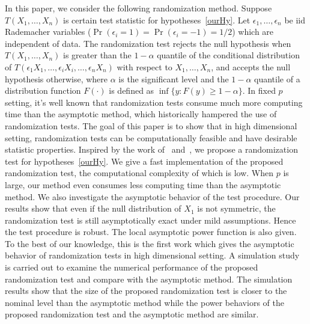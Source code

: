 \documentclass[3p]{elsarticle}
\theoremstyle{plain}
\theoremstyle{definition}
\theoremstyle{remark}
\begin{document}
In this paper, we consider the following randomization method.
Suppose $T(X_1,\ldots,X_n)$ is certain test statistic for hypotheses~\eqref{ourHy}.
Let $\epsilon_1,\ldots,\epsilon_n$ be iid Rademacher variables ($\Pr(\epsilon_i=1)=\Pr(\epsilon_i=-1)=1/2$) which are independent of data.
 The randomization test rejects the null hypothesis when $T(X_1,\ldots, X_n)$ is greater than the $1-\alpha$ quantile of the conditional distribution of $T(\epsilon_1 X_1,\ldots,\epsilon_i X_i,\ldots,\epsilon_n X_n)$ with respect to $X_1,\ldots,X_n$,
 and accepts the null hypothesis otherwise, where $\alpha$ is the significant level and the $1-\alpha$ quantile of a distribution function $F(\cdot)$ is defined as $\inf\{y: F(y)\geq 1-\alpha\}$.
In fixed $p$ setting, it's well known that randomization tests consume much more computing time than the asymptotic method, which  historically  hampered the use of randomization tests. 
The goal of this paper is to show that in high dimensional setting, randomization tests can be computationally feasible and have desirable statistic properties.
Inspired by the work of~\citet{Bai1996Efiect} and~\citet{Chen2010A}, we propose a randomization test for hypotheses~\eqref{ourHy}.
We give a fast implementation of the proposed randomization test, the computational complexity of which is low.
When $p$ is large, our method even consumes less computing time  than the asymptotic method.
We also investigate the asymptotic behavior of the test procedure.
Our results show that even if the null distribution of $X_1$ is not symmetric, the randomization test is still asymptotically exact under mild assumptions. 
Hence the test procedure is robust.
The local asymptotic power function is also given.
To the best of our knowledge, this is the first work which gives the asymptotic behavior of randomization tests in high dimensional setting.
A simulation study is carried out to examine the numerical performance of the proposed randomization test and compare with the asymptotic method.
The simulation results show that the size of the proposed randomization test is closer to the nominal level than the asymptotic method while the power behaviors of the proposed randomization test and the asymptotic method are similar.

\end{document}

